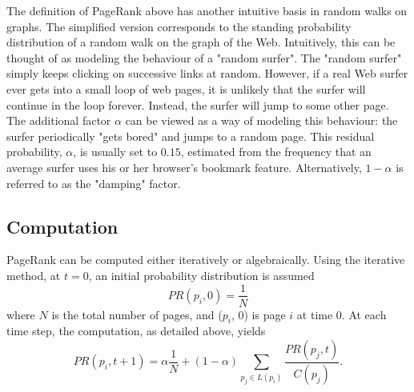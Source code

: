 \documentclass[11pt,a4paper]{article}
\begin{document}
The definition of PageRank above has another intuitive basis in random walks on graphs. The simplified version corresponds to the standing probability distribution of a random walk on the graph of the Web. Intuitively, this can be thought of as modeling the behaviour of a "random surfer". The "random surfer" simply keeps clicking on successive links at random. However, if a real Web surfer ever gets into a small loop of web pages, it is unlikely that the surfer will continue in the loop forever. Instead, the surfer will jump to some other page. The additional factor $\alpha$ can be viewed as a way of modeling this behaviour: the surfer periodically "gets bored" and jumps to a random page.  This residual probability, $\alpha$, is usually set to $0.15$, estimated from the frequency that an average surfer uses his or her browser's bookmark feature. Alternatively, $1 - \alpha$ is referred to as the "damping" factor.
\subsection{Computation}
PageRank can be computed either iteratively or algebraically. Using the iterative method, at $t = 0$, an initial probability distribution is assumed
$$PR(p_i, 0) = \frac{1}{N}$$
where $N$ is the total number of pages, and ($p_i$, $0$) is page $i$ at time $0$. At each time step, the computation, as detailed above, yields
$$PR(p_i, t + 1) = \alpha \frac{1}{N} + (1 - \alpha) \sum_{p_j \in L(p_i)}\frac{PR(p_j, t)}{C(p_j)} .$$
\end{document}

